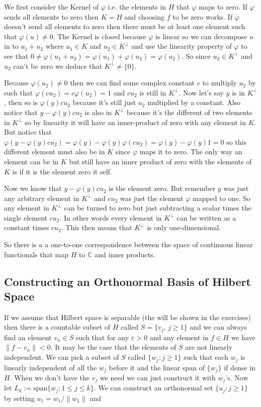 \documentclass[oneside]{book}
\newenvironment{proof}[1][Proof]{\begin{trivlist}
\item[\hskip \labelsep {\bfseries #1}]}{\end{trivlist}}
\begin{document}
\begin{proof}
We first consider the Kernel of $\varphi$ i.e. the elements in $H$ that $\varphi$ maps to zero. If $\varphi$ sends all elements to zero then $K=H$ and choosing $f$ to be zero works. If $\varphi$ doesn't send all elements to zero then there must be at least one element such that $\varphi(u) \neq 0$. The Kernel is closed because $\varphi$ is linear so we can decompose $u$ in to $u_1+u_2$ where $u_1 \in K$ and $u_2 \in K^\perp$ and use the linearity property of $\varphi$ to see that $0\neq \varphi(u_1+u_2)=\varphi(u_1)+\varphi(u_2)=\varphi(u_2)$. So since $u_2 \in K^\perp$ and $u_2$ can't be zero we deduce that $K^\perp \neq \{0\}$. 

Because $\varphi(u_2) \neq 0$ then we can find some complex constant $c$ to multiply $u_2$ by such that $\varphi(cu_2) = c \varphi(u_2)=1$ and $cu_2$ is still in $K^\perp$. Now let's say $y$ is in $K^\perp$, then so is $\varphi(y)cu_2$ because it's still just $u_2$ multiplied by a constant. Also notice that $y-\varphi(y)cu_2$ is also in $K^\perp$ because it's the different of two elements in $K^\perp$ so by linearity it will have an inner-product of zero with any element in $K$. But notice that $\varphi(y-\varphi(y) c u_2)=\varphi(y)- \varphi(y) \varphi(cu_2)=\varphi(y)- \varphi(y) 1 = 0$ so this different element must also be in $K$ since $\varphi$ maps it to zero. The only way an element can be in $K$ but still have an inner product of zero with the elements of $K$ is if it is the element zero it self.

Now we know that $y-\varphi(y)c u_2$ is the element zero. But remember $y$ was just any arbitrary element in $K^\perp$ and $cu_2$ was just the element $\varphi$ mapped to one. So any element in $K^\perp$ can be turned to zero but just subtracting a scalar times  the single element $cu_2$. In other words every element in $K^\perp$ can be written as a constant times $cu_2$. This then means that $K^\perp$ is only one-dimensional.
\end{proof}

So there is a a one-to-one correspondence between the space of continuous linear functionals that map $H$ to $\mathbb{C}$ and inner products. 

\subsection{Constructing an Orthonormal Basis of Hilbert Space}
If we assume that Hilbert space is separable (the will be shown in the exercises) then there is a countable subset of $H$ called $S=\{v_j,\, j \ge 1 \}$ and we can always find an element $v_n \in S$ such that for any $\varepsilon > 0$ and any element in $f \in H$ we have $\|f-v_n\| < 0$. It may be the case that the elements of $S$ are not linearly independent. We can pick a subset of $S$ called $\{w_j: j\ge1 \}$ such that each $w_j$ is linearly independent of all the $w_j$ before it and the linear span of $\{w_j\}$ if dense in $H$. When we don't have the $v_j$ we need we can just construct it with $w_j$'s. Now let $L_k := \mathrm{span}\{w_j: 1 \le j \le k\}$. We can construct an orthonormal set $\{u_j: j \ge 1\}$ by setting $u_1=w_1 / \|w_1\|$ and
\end{document}
